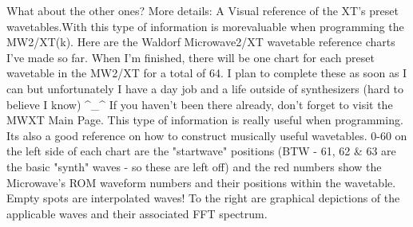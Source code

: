 What about the other ones?
More details: A Visual reference of the XT's preset wavetables.With this type of information is morevaluable when programming the MW2/XT(k). 
Here are the Waldorf Microwave2/XT wavetable reference charts I've made so far. When I'm finished, there will be one chart for each preset wavetable in the MW2/XT for a total of 64. I plan to complete these as soon as I can but unfortunately I have a day job and a life outside of synthesizers (hard to believe I know) ^_^
If you haven't been there already, don't forget to visit the MWXT Main Page.
This type of information is really useful when programming. Its also a good reference on how to construct musically useful wavetables. 0-60 on the left side of each chart are the "startwave" positions (BTW - 61, 62 \& 63 are the basic "synth" waves - so these are left off) and the red numbers show the Microwave's ROM waveform numbers and their positions within the wavetable. Empty spots are interpolated waves! To the right are graphical depictions of the applicable waves and their associated FFT spectrum.

